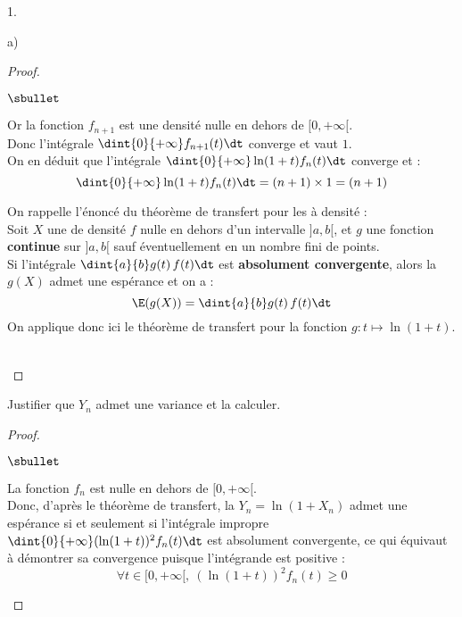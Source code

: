 \documentclass[11pt]{article}%
\begin{document}
\begin{noliste}{1.}
\begin{noliste}{a)}
\begin{proof}
\begin{noliste}{$\sbullet$}
\item Or la fonction $f_{n+1}$ est une densité nulle en dehors de
  $[0,+\infty[$. \\
  Donc l'intégrale $\dint{0}{+\infty} f_{n+1}(t) \dt$
  converge et vaut $1$.\\
  On en déduit que l'intégrale $\dint{0}{+\infty} \ln(1+t) f_n(t) \dt$
  converge et :
  \[
   \dint{0}{+\infty} \ln(1+t) f_n(t) \dt = (n+1) \times 1 =
   (n+1)
  \]
 \end{noliste}
 
 \begin{remark}
  On rappelle l'énoncé du théorème de transfert pour les \var à densité 
  :\\
  Soit $X$ une \var de densité $f$ nulle en dehors d'un intervalle 
  $]a,b[$, et $g$ une fonction {\bf 
  continue} sur $]a,b[$ sauf éventuellement en un nombre fini de 
  points.\\ 
  Si l'intégrale $\dint{a}{b} g(t) \, f(t) \dt$ 
  est {\bf absolument convergente}, alors la \var $g(X)$ admet une 
  espérance et on a :
  \[
   \E(g(X)) = \dint{a}{b} g(t) \, f(t) \dt
  \]
  On applique donc ici le théorème de transfert pour la fonction 
  $g:t\mapsto \ln(1+t)$.
 \end{remark}~\\[-1.4cm]
\end{proof}


\item Justifier que $Y_n$ admet une variance et la calculer.

  \begin{proof}~
    \begin{noliste}{$\sbullet$}
    \item La fonction $f_n$ est nulle en dehors de $[0,+\infty[$.\\[.1cm]
      Donc, d'après le théorème de transfert, la \var $Y_n =
      \ln(1+X_n)$ admet une espérance si et seulement si l'intégrale
      impropre $\dint{0}{+\infty} (\ln(1+t))^2 f_n(t) \dt$ est
      absolument convergente, ce qui équivaut à démontrer sa
      convergence puisque l'intégrande est positive :
      \[
      \forall t \in [0,+\infty[, \ (\ln(1+t))^2 f_n(t) \geq 0
      \]
      
  
      \newpage
  

\end{noliste}
\end{proof}
\end{noliste}
\end{noliste}
\end{document}
